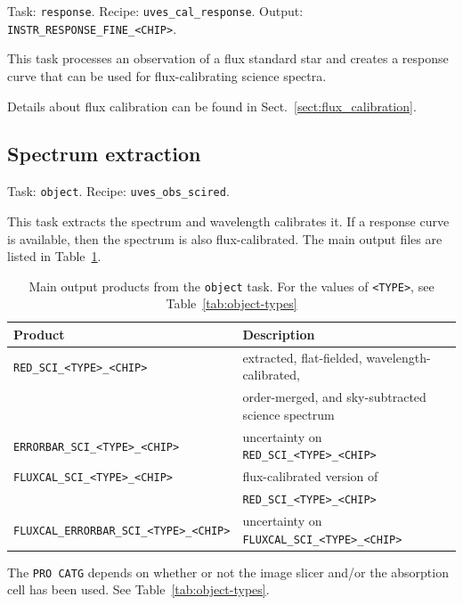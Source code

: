 Task: {\tt response}. Recipe: {\tt uves\_cal\_response}. Output: {\tt INSTR\_RESPONSE\_FINE\_<CHIP>}.

This task processes an observation of a flux standard star and creates a response curve that can
be used for flux-calibrating science spectra.

Details about flux calibration can be found in Sect.~\ref{sect:flux_calibration}.

\subsection{Spectrum extraction}
\label{sec:extraction}

Task: {\tt object}. Recipe: {\tt uves\_obs\_scired}. 

This task extracts the spectrum and wavelength calibrates it. If a response curve is available, then 
the spectrum is also flux-calibrated. The main output files are listed in Table~\ref{tab:object-output}.

\begin{table}[htbp]
\centering
\begin{tabular}{|l|l|}
\hline
\textbf{Product} & \textbf{Description} \\
\hline 
{\tt RED\_SCI\_<TYPE>\_<CHIP>}               &extracted, flat-fielded, wavelength-calibrated, \\
                                             &order-merged, and sky-subtracted science spectrum\\
{\tt ERRORBAR\_SCI\_<TYPE>\_<CHIP>}          &uncertainty on {\tt RED\_SCI\_<TYPE>\_<CHIP>}\\
{\tt FLUXCAL\_SCI\_<TYPE>\_<CHIP>}           &flux-calibrated version of\\
                                             &{\tt RED\_SCI\_<TYPE>\_<CHIP>}\\
{\tt FLUXCAL\_ERRORBAR\_SCI\_<TYPE>\_<CHIP>} &uncertainty on {\tt FLUXCAL\_SCI\_<TYPE>\_<CHIP>}\\
\hline
\end{tabular}
\caption{Main output products from the {\tt object} task. For the values of {\tt <TYPE>}, see Table~\ref{tab:object-types}}
\label{tab:object-output}
\end{table}

The {\tt PRO CATG} depends on whether or not the image slicer and/or the absorption cell has been used.
See Table~\ref{tab:object-types}. 

